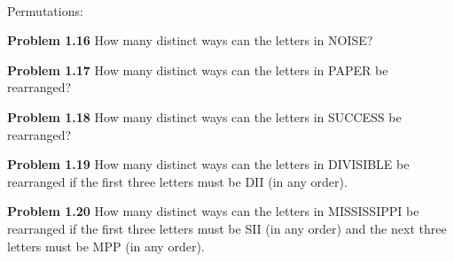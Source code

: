 \documentclass[11pt]{scrartcl}
\begin{document}
\\
\noindent 
Permutations: 
\begin{tcolorbox}
\textbf{Problem 1.16} How many distinct ways can the letters in NOISE?
\end{tcolorbox}
\begin{tcolorbox}
\textbf{Problem 1.17} How many distinct ways can the letters in PAPER be rearranged? 
\end{tcolorbox}
\begin{tcolorbox}
\textbf{Problem 1.18} How many distinct ways can the letters in SUCCESS be rearranged? 
\end{tcolorbox}
\begin{tcolorbox}
\textbf{Problem 1.19} How many distinct ways can the letters in DIVISIBLE be rearranged if the first three letters must be DII (in any order). 
\end{tcolorbox}
\begin{tcolorbox}
\textbf{Problem 1.20} How many distinct ways can the letters in MISSISSIPPI be rearranged if the first three letters must be SII (in any order) and the next three letters must be MPP (in any order). 
\end{tcolorbox}
\end{document}
